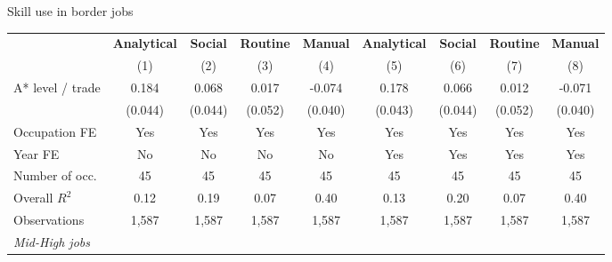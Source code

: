 \begin{landscape}
\begin{center}
\begin{threeparttable}[!h]
\caption{Skill use in border jobs}
\label{tab:skillRegs}
\begin{tabular}{lcccccccc}
\toprule
\toprule
&\multicolumn{1}{c}{\textbf{Analytical}}&\multicolumn{1}{c}{\textbf{Social}}&\multicolumn{1}{c}{\textbf{Routine}}&\multicolumn{1}{c}{\textbf{Manual}}&\multicolumn{1}{c}{\textbf{Analytical}}&\multicolumn{1}{c}{\textbf{Social}}&\multicolumn{1}{c}{\textbf{Routine}}&\multicolumn{1}{c}{\textbf{Manual}} \\
\textbf{}&\multicolumn{1}{c}{(1)}&\multicolumn{1}{c}{(2)}&\multicolumn{1}{c}{(3)}&\multicolumn{1}{c}{(4)}&\multicolumn{1}{c}{(5)}&\multicolumn{1}{c}{(6)}&\multicolumn{1}{c}{(7)}&\multicolumn{1}{c}{(8)} \\
\midrule
A* level / trade    &       0.184\sym{***}&       0.068         &       0.017         &      -0.074         &       0.178\sym{***}&       0.066         &       0.012         &      -0.071         \\
                    &     (0.044)         &     (0.044)         &     (0.052)         &     (0.040)         &     (0.043)         &     (0.044)         &     (0.052)         &     (0.040)         \\
Occupation FE       &         Yes         &         Yes         &         Yes         &         Yes         &         Yes         &         Yes         &         Yes         &         Yes         \\
Year FE             &          No         &          No         &          No         &          No         &         Yes         &         Yes         &         Yes         &         Yes         \\
\midrule Number of occ.&          45         &          45         &          45         &          45         &          45         &          45         &          45         &          45         \\
Overall $ R^2$      &        0.12         &        0.19         &        0.07         &        0.40         &        0.13         &        0.20         &        0.07         &        0.40         \\
Observations        &       1,587         &       1,587         &       1,587         &       1,587         &       1,587         &       1,587         &       1,587         &       1,587         \\
\midrule \textit{Mid-High jobs} \\

\end{tabular}
\end{threeparttable}
\end{center}
\end{landscape}
